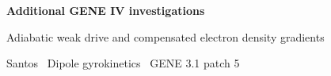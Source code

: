 \documentclass[10pt]{article}
\begin{document}
{\LARGE\bfseries Additional GENE IV investigations\par}
\smallskip
{\large Adiabatic weak drive and compensated electron density gradients\par}
\smallskip
Santos \textperiodcentered\ Dipole gyrokinetics \textperiodcentered\ GENE 3.1 patch 5


\clearpage

\clearpage

\clearpage



\end{document}

